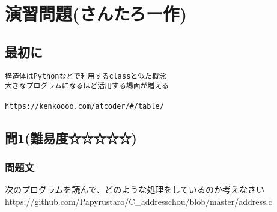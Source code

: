 \section{演習問題(さんたろー作)}
\subsection{最初に}
\begin{verbatim}
構造体はPythonなどで利用するclassと似た概念
大きなプログラムになるほど活用する場面が増える

https://kenkoooo.com/atcoder/#/table/

\end{verbatim}
\subsection{問1(難易度☆☆☆☆☆)}
\subsubsection{問題文}
次のプログラムを読んで、どのような処理をしているのか考えなさい\\

https://github.com/Papyrustaro/C\_addresschou/blob/master/address.c
